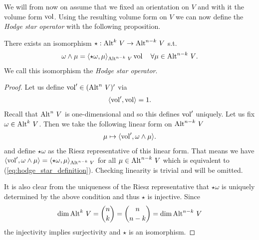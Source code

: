 \documentclass[../master_thesis.tex]{subfiles}
\begin{document}
We will from now on assume that we fixed an orientation on $V$ and with it 
the volume form $\operatorname{vol}$. 
Using the resulting volume form on $V$
we can now define the \textit{Hodge star operator} with the following 
proposition.
\begin{proposition}
    There exists an isomorphism $\star: {\operatorname{Alt}^{k}\,V} 
    \rightarrow {\operatorname{Alt}^{n-k}\,V}$ s.t. 
    \begin{align}
        \omega \wedge \mu = \langle \star \omega, \mu \rangle_{\alternating{n-k}{V}}
        \vol \quad \forall \mu \in \alternating{n-k}{V}.
        \label{eq:hodge_star_definition}            
    \end{align}
    We call this isomorphism the \textit{Hodge star operator}.
\end{proposition}
\begin{proof}

    Let us define $\operatorname{vol}' \in ({\operatorname{Alt}^{n}\,V})'$ via 
    \begin{align*}
        \langle \operatorname{vol}', \operatorname{vol} \rangle = 1.
    \end{align*}
    Recall that ${\operatorname{Alt}^{n}\,V}$ is one-dimensional and so this defines $\operatorname{vol}'$ 
    uniquely. Let us fix $\omega \in {\operatorname{Alt}^{k}\,V}$. 
    Then we take the following linear form on $
    {\operatorname{Alt}^{n-k}\,V}$
    \begin{align*}
        \mu \mapsto \langle \operatorname{vol}' ,\omega \wedge \mu \rangle.
    \end{align*}
    and define
    $\star \omega$ as the Riesz representative of this linear form. That means we 
    have $\langle \operatorname{vol}', \omega \wedge \mu \rangle = 
    \langle \star \omega, \mu \rangle_{{\operatorname{Alt}^{n-k}\,V}}$ for all 
    $\mu \in {\operatorname{Alt}^{n-k}\,V}$ which is equivalent to (\ref{eq:hodge_star_definition}).
    Checking linearity is trivial and will be omitted.

    It is also clear from the uniqueness of the Riesz representative that 
    $\star\omega$ is uniquely determined by the above condition and 
    thus $\star$ is injective. Since 
    \begin{align*}
        \dim {\operatorname{Alt}^{k}\,V} = 
        \binom{n}{k} = \binom{n}{n-k} = \dim {\operatorname{Alt}^{n-k}\,V}
    \end{align*}    
    the injectivity 
    implies surjectivity and $\star$ is an isomorphism.
\end{proof}
\end{document}
